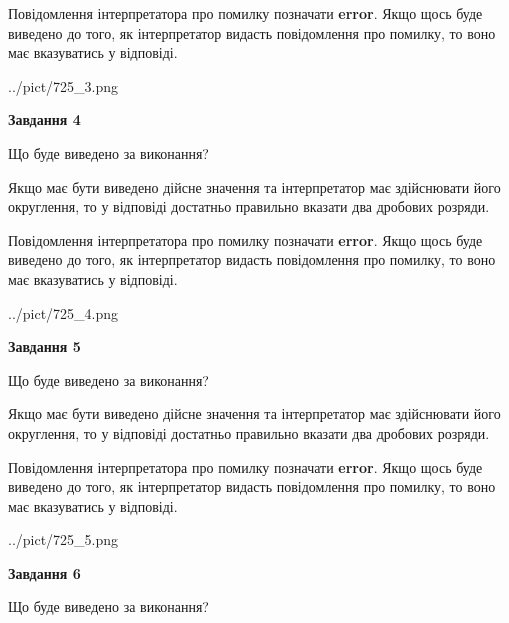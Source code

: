 \documentclass[12pt, ukrainian]{article}
\begin{document}
{\begin {Large}
Повідомлення інтерпретатора про помилку позначати \textbf{error}.
Якщо щось буде виведено до того, як інтерпретатор видасть повідомлення про помилку, 
то воно має вказуватись у відповіді. \par

\begin{center}
	{../pict/725_3.png}
\end{center}
\newpage

{\begin {center}\textbf{Завдання 4}\end {center}}\par
Що буде виведено за виконання? \par

Якщо має бути виведено дійсне значення та інтерпретатор має здійснювати його округлення, 
то у відповіді достатньо правильно вказати два дробових розряди.

Повідомлення інтерпретатора про помилку позначати \textbf{error}.
Якщо щось буде виведено до того, як інтерпретатор видасть повідомлення про помилку, 
то воно має вказуватись у відповіді. \par

\begin{center}
	{../pict/725_4.png}
\end{center}
\newpage

{\begin {center}\textbf{Завдання 5}\end {center}}\par
Що буде виведено за виконання? \par

Якщо має бути виведено дійсне значення та інтерпретатор має здійснювати його округлення, 
то у відповіді достатньо правильно вказати два дробових розряди.

Повідомлення інтерпретатора про помилку позначати \textbf{error}.
Якщо щось буде виведено до того, як інтерпретатор видасть повідомлення про помилку, 
то воно має вказуватись у відповіді. \par

\begin{center}
	{../pict/725_5.png}
\end{center}
\newpage

{\begin {center}\textbf{Завдання 6}\end {center}}\par
Що буде виведено за виконання? \par


\end{Large}}
\end{document}
